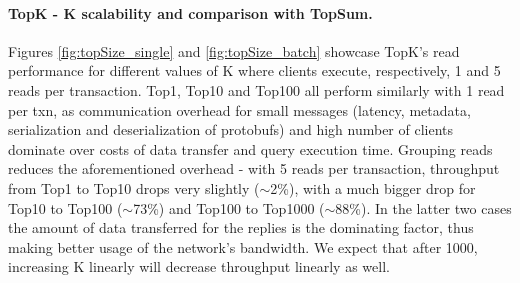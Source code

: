 \documentclass[sigconf, nonacm]{acmart}
\begin{document}

\paragraph{TopK - K scalability and comparison with TopSum.} %

Figures \ref{fig:topSize_single} and \ref{fig:topSize_batch} showcase TopK's read performance for different values of K where clients execute, respectively, 1 and 5 reads per transaction.
Top1, Top10 and Top100 all perform similarly with 1 read per txn, as communication overhead for small messages (latency, metadata, serialization and deserialization of protobufs) and high number of clients dominate over costs of data transfer and query execution time.
Grouping reads reduces the aforementioned overhead - with 5 reads per transaction, throughput from Top1 to Top10 drops very slightly ($\sim$2\%), with a much bigger drop for Top10 to Top100 ($\sim$73\%) and Top100 to Top1000 ($\sim$88\%).
In the latter two cases the amount of data transferred for the replies is the dominating factor, thus making better usage of the network's bandwidth.
We expect that after 1000, increasing K linearly will decrease throughput linearly as well.

\end{document}

